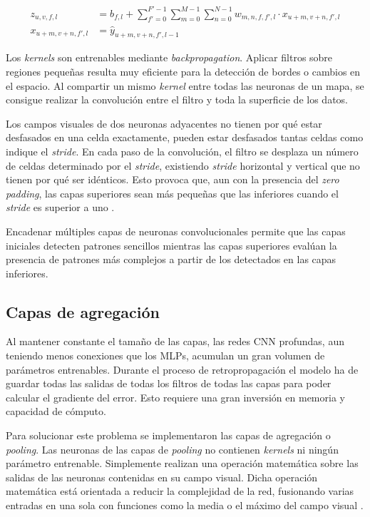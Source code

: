 \begin{align}
	z_{u,v,f,l} &= b_{f,l} + \sum_{f'=0}^{F'-1}\sum_{m=0}^{M-1} \sum_{n=0}^{N-1} w_{m,n,f,f',l} \cdot x_{u+m,v+n,f',l} \label{eq32}\\
	x_{u+m,v+n,f',l} &= \hat{y}_{u+m,v+n,f',l-1}
\end{align}

Los \textit{kernels} son entrenables mediante \textit{backpropagation}. Aplicar filtros sobre regiones pequeñas resulta muy eficiente para la detección de bordes o cambios en el espacio. Al compartir un mismo \textit{kernel} entre todas las neuronas de un mapa, se consigue realizar la convolución entre el filtro y toda la superficie de los datos.

Los campos visuales de dos neuronas adyacentes no tienen por qué estar desfasados en una celda exactamente, pueden estar desfasados tantas celdas como indique el \textit{stride}. En cada paso de la convolución, el filtro se desplaza un número de celdas determinado por el \textit{stride}, existiendo \textit{stride} horizontal y vertical que no tienen por qué ser idénticos. Esto provoca que, aun con la presencia del \textit{zero padding}, las capas superiores sean más pequeñas que las inferiores cuando el \textit{stride} es superior a uno \cite{cnn1,cnn2}.

Encadenar múltiples capas de neuronas convolucionales permite que las capas iniciales detecten patrones sencillos mientras las capas superiores evalúan la presencia de patrones más complejos a partir de los detectados en las capas inferiores.

\subsection{Capas de agregación}
Al mantener constante el tamaño de las capas, las redes CNN profundas, aun teniendo menos conexiones que los MLPs, acumulan un gran volumen de parámetros entrenables. Durante el proceso de retropropagación el modelo ha de guardar todas las salidas de todas los filtros de todas las capas para poder calcular el gradiente del error. Esto requiere una gran inversión en memoria y capacidad de cómputo.

Para solucionar este problema se implementaron las capas de agregación o \textit{pooling}. Las neuronas de las capas de \textit{pooling} no contienen \textit{kernels} ni ningún parámetro entrenable. Simplemente realizan una operación matemática sobre las salidas de las neuronas contenidas en su campo visual. Dicha operación matemática está orientada a reducir la complejidad de la red, fusionando varias entradas en una sola con funciones como la media o el máximo del campo visual \cite{cnn1,cnn2}.

